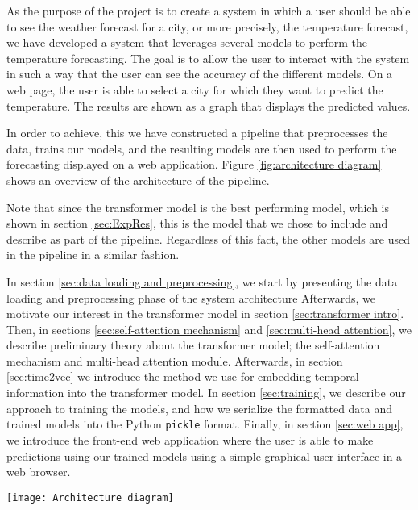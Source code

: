 As the purpose of the project is to create a system in which a user should be able to see the weather forecast for a city, or more precisely, the temperature forecast, we have developed a system that leverages several models to perform the temperature forecasting. 
The goal is to allow the user to interact with the system in such a way that the user can see the accuracy of the different models. 
On a web page, the user is able to select a city for which they want to predict the temperature.
The results are shown as a graph that displays the predicted values.

In order to achieve, this we have constructed a pipeline that preprocesses the data, trains our models, and the resulting models are then used to perform the forecasting displayed on a web application. 
Figure \ref{fig:architecture diagram} shows an overview of the architecture of the pipeline.

Note that since the transformer model is the best performing model, which is shown in section \ref{sec:ExpRes}, this is the model that we chose to include and describe as part of the pipeline. Regardless of this fact, the other models are used in the pipeline in a similar fashion.

In section \ref{sec:data loading and preprocessing}, we start by presenting the data loading and preprocessing phase of the system architecture
Afterwards, we motivate our interest in the transformer model in section \ref{sec:transformer intro}.
Then, in sections \ref{sec:self-attention mechanism} and \ref{sec:multi-head attention}, we describe preliminary theory about the transformer model; the self-attention mechanism and multi-head attention module. 
Afterwards, in section \ref{sec:time2vec} we introduce the method we use for embedding temporal information into the transformer model. 
In section \ref{sec:training}, we describe our approach to training the models, and how we serialize the formatted data and trained models into the Python \texttt{pickle} format.
Finally, in section \ref{sec:web app}, we introduce the front-end web application where the user is able to make predictions using our trained models using a simple graphical user interface in a web browser.



\begin{figure*}
	\centering
	\texttt{[image: Architecture diagram]}
	\caption{The architecture of the system pipeline.}
	\label{fig:architecture diagram}
\end{figure*}